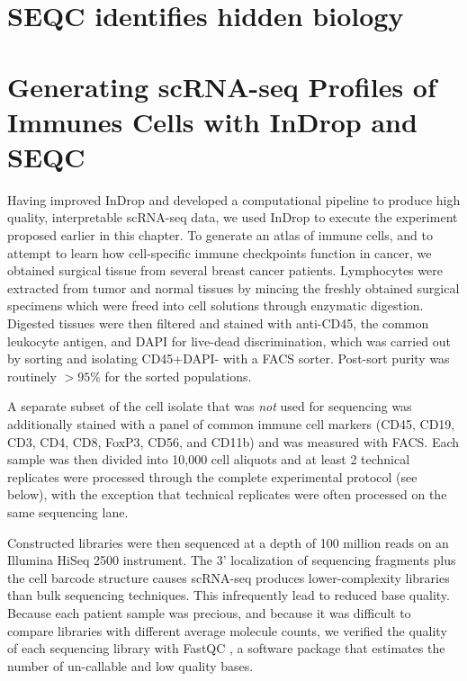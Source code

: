 \section{SEQC identifies hidden biology}

\section{Generating scRNA-seq Profiles of Immunes Cells with InDrop and SEQC} %

Having improved InDrop and developed a computational pipeline to produce high quality, interpretable scRNA-seq data, we used InDrop to execute the experiment proposed earlier in this chapter. 
To generate an atlas of immune cells, and to attempt to learn how cell-specific immune checkpoints function in cancer, we obtained surgical tissue from several breast cancer patients. 
Lymphocytes were extracted from tumor and normal tissues by mincing the freshly obtained surgical specimens which were freed into cell solutions through enzymatic digestion. 
Digested tissues were then filtered and stained with anti-CD45, the common leukocyte antigen, and DAPI for live-dead discrimination, which was carried out by sorting and isolating CD45+DAPI- with a FACS sorter.  
Post-sort purity was routinely $>95\%$ for the sorted populations.

A separate subset of the cell isolate that was \textit{not} used for sequencing was additionally stained with a panel of common immune cell markers (CD45, CD19, CD3, CD4, CD8, FoxP3, CD56, and CD11b) and was measured with FACS\@. 
Each sample was then divided into 10,000 cell aliquots and at least 2 technical replicates were processed through the complete experimental protocol (see below), with the exception that technical replicates were often processed on the same sequencing lane. 

Constructed libraries were then sequenced at a depth of 100 million reads on an Illumina HiSeq 2500 instrument.
The 3' localization of sequencing fragments plus the cell barcode structure causes scRNA-seq produces lower-complexity libraries than bulk sequencing techniques. 
This infrequently lead to reduced base quality. 
Because each patient sample was precious, and because it was difficult to compare libraries with different average molecule counts, we verified the quality of each sequencing library with FastQC \citep{Andrews2010}, a software package that estimates the number of un-callable and low quality bases.

